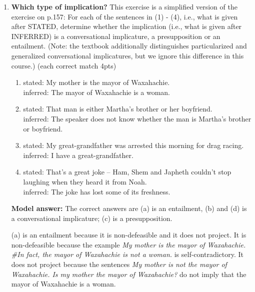 \documentclass[a4,11pt]{article}
\newcommand{\6}{\mbox{$[\hspace*{-.6mm}[$}}
\newcommand{\9}{\mbox{$]\hspace*{-.6mm}]$}}
\begin{document}
\begin{enumerate}[leftmargin = 12pt]
{ \bf Model answer:} As per CC p.28, implicatures are defeasible and reinforceable. Entailments are not defeasible nor reinforceable and they do not project over entailment-cancelling operators. Presuppositions are not defeasible nor reinforceable but they do project over entailment-cancelling operators. 

\item  { \bf Which type of implication?} This exercise is a simplified version of the exercise on p.157: For each of the sentences in (1) - (4), i.e., what is given after STATED, determine whether the implication (i.e., what is given after INFERRED) is a conversational implicature, a presupposition or an entailment. (Note: the textbook additionally distinguishes particularized and generalized conversational implicatures, but we ignore this difference in this course.) (each correct match 4pts)


\begin{enumerate}[noitemsep]
\item stated: My mother is the mayor of Waxahachie. \\ 
	inferred: The mayor of Waxahachie is a woman.
\item stated:  That man is either Martha’s brother or her boyfriend.  \\
	inferred: The speaker does not know whether the man is Martha’s brother or boyfriend.
\item stated:  My great-grandfather was arrested this morning for drag racing. \\  
	inferred:  I have a great-grandfather.
\item stated: That’s a great joke – Ham, Shem and Japheth couldn’t stop laughing when they heard it from Noah. \\  
	inferred: The joke has lost some of its freshness.
\end{enumerate}


{ \bf Model answer:} The correct answers are (a) is an entailment, (b) and (d) is a conversational implicature; (c) is a presupposition. 

(a) is an entailment because it is non-defeasible and it does not project. It is non-defeasible because the example {\it My mother is the mayor of Waxahachie. \#In fact, the mayor of Waxahachie is not a woman.} is self-contradictory. It does not project because the sentences  {\it My mother is not the mayor of Waxahachie. Is my mother the mayor of Waxahachie?} do not imply that the mayor of Waxahachie is a woman.


\end{enumerate}
\end{document}
